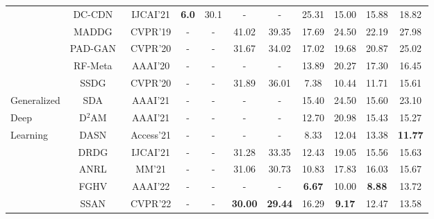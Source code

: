 \documentclass[10pt,journal,compsoc]{IEEEtran}
\begin{document}
\begin{table}[!htb]
{\begin{tabular}{l|c|c|c|c|c|c|c|c|c|c}
   & DC-CDN~\cite{yu2021dual} & IJCAI'21 & \textbf{6.0} & 30.1  &  - & -  & 25.31 & 15.00  & 15.88 & 18.82
   \\ \cline{1-11}


   
   & MADDG~\cite{shao2019multi} & CVPR'19  &  - & -  & 41.02 & 39.35 & 17.69 & 24.50  & 22.19 & 27.98
    \\ \cline{2-11}
    
    & PAD-GAN~\cite{wang2020cross} & CVPR'20  &  - & -  & 31.67 & 34.02 & 17.02 & 19.68  & 20.87 & 25.02
    \\ \cline{2-11}
    
  
    
   
   & RF-Meta~\cite{shao2019regularized} & AAAI'20  &  - & -  &  - & -  & 13.89 & 20.27  & 17.30 & 16.45
    \\ \cline{2-11}
    
    
   & SSDG~\cite{jia2020single} & CVPR'20  &  - & -  & 31.89 & 36.01 & 7.38 &  10.44  & 11.71 & 15.61
    \\ \cline{2-11}
    
   Generalized
   & SDA~\cite{wang2021self} & AAAI'21  &   - & -  &  - & -  & 15.40 & 24.50  & 15.60 & 23.10
    \\ \cline{2-11}
    
    \quad Deep
   & D$^2$AM~\cite{chen2021generalized} & AAAI'21  &  - & -  &  - & -  & 12.70 & 20.98  & 15.43 & 15.27
    \\ \cline{2-11}
    
    Learning
      & DASN~\cite{kim2020suppressing} & Access'21  &   - & -  &  - & -  & 8.33 & 12.04  & 13.38 & \textbf{11.77}
    \\ \cline{2-11}
    
    
    & DRDG~\cite{liu2021dual} & IJCAI'21  &  - & -  &  31.28 & 33.35 & 12.43 & 19.05  & 15.56 & 15.63
    \\ \cline{2-11}
    
    & ANRL~\cite{liu2021adaptive} & MM'21  &  - & -  & 31.06 & 30.73 & 10.83 & 17.83  & 16.03 & 15.67
     \\ \cline{2-11}
    
    & FGHV~\cite{liu2022feature} & AAAI'22  &  - & -  & - & - & \textbf{6.67} & 10.00  & \textbf{8.88} & 13.72
    
    \\ \cline{2-11}
    
    & SSAN~\cite{wang2022domain} & CVPR'22  &  - & -  &  \textbf{30.00} & \textbf{29.44} & 16.29 & \textbf{9.17}  & 12.47 & 13.58
    
   
   
    \\ 
    
	\bottomrule[1pt]	
	\end{tabular}}
	
    \label{tab:semi_DG_intra}
    \vspace{-0.2em}
\end{table}
\end{document}
